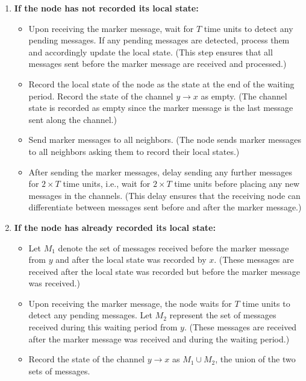 \begin{enumerate}
    \item \textbf{If the node has not recorded its local state:}
    \begin{itemize}
        \item Upon receiving the marker message, wait for \(T\) time units to detect any pending messages. If any pending messages are detected, process them and accordingly update the local state. (This step ensures that all messages sent before the marker message are received and processed.)
        \item Record the local state of the node as the state at the end of the waiting period. Record the state of the channel \(y \rightarrow x\) as empty. (The channel state is recorded as empty since the marker message is the last message sent along the channel.)
        \item Send marker messages to all neighbors. (The node sends marker messages to all neighbors asking them to record their local states.)
        \item After sending the marker messages, delay sending any further messages for \(2 \times T\) time units, i.e., wait for \(2 \times T\) time units before placing any new messages in the channels. (This delay ensures that the receiving node can differentiate between messages sent before and after the marker message.)
    \end{itemize}
    
    \item \textbf{If the node has already recorded its local state:}
    \begin{itemize}
        \item Let \(M_1\) denote the set of messages received before the marker message from \(y\) and after the local state was recorded by \(x\). (These messages are received after the local state was recorded but before the marker message was received.)
        \item Upon receiving the marker message, the node waits for \(T\) time units to detect any pending messages. Let \(M_2\) represent the set of messages received during this waiting period from \(y\). (These messages are received after the marker message was received and during the waiting period.)
        \item Record the state of the channel \(y \rightarrow x\) as \(M_1 \cup M_2\), the union of the two sets of messages. 
    \end{itemize}
\end{enumerate}

